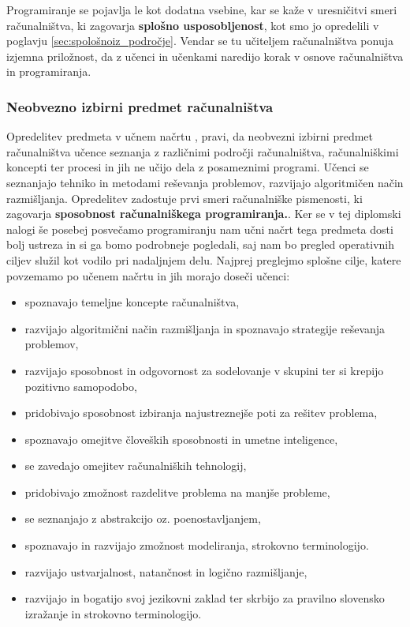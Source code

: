 Programiranje se pojavlja le kot dodatna vsebine, kar se kaže v
uresničitvi smeri računalništva, ki zagovarja \textbf{splošno
  usposobljenost}, kot smo jo opredelili v poglavju
\ref{sec:spološnoiz_področje}. Vendar se tu učiteljem računalništva
ponuja izjemna priložnost, da z učenci in učenkami naredijo korak v
osnove računalništva in programiranja.

\subsubsection{Neobvezno izbirni predmet računalništva}
\label{sec:neobvezno_izbirni_predmet_rac}

Opredelitev predmeta v učnem načrtu
\cite{ucni_nacrt-neobvezni-izbirni-os}, pravi, da neobvezni izbirni
predmet računalništva učence seznanja z različnimi področji
računalništva, računalniškimi koncepti ter procesi in jih ne učijo
dela z posameznimi programi. Učenci se seznanjajo tehniko in metodami
reševanja problemov, razvijajo algoritmičen način
razmišljanja. Opredelitev zadostuje prvi smeri računalniške
pismenosti, ki zagovarja \textbf{sposobnost računalniškega
  programiranja.}. Ker se v tej diplomski nalogi še posebej posvečamo
programiranju nam učni načrt tega predmeta dosti bolj ustreza in si ga
bomo podrobneje pogledali, saj nam bo pregled operativnih ciljev
služil kot vodilo pri nadaljnjem delu.  Najprej preglejmo splošne
cilje, katere povzemamo po učenem načrtu
\cite{ucni_nacrt-neobvezni-izbirni-os} in jih morajo doseči učenci:
\begin{itemize}
\tightlist
\item spoznavajo temeljne koncepte računalništva,
\item razvijajo algoritmični način razmišljanja in spoznavajo
  strategije reševanja problemov,
\item razvijajo sposobnost in odgovornost za sodelovanje v skupini ter
  si krepijo pozitivno samopodobo,
\item pridobivajo sposobnost izbiranja najustreznejše poti za rešitev
  problema,
\item  spoznavajo omejitve človeških sposobnosti in umetne
  inteligence,
\item se zavedajo omejitev računalniških tehnologij,
\item pridobivajo zmožnost razdelitve problema na manjše probleme,
\item se seznanjajo z abstrakcijo oz. poenostavljanjem,
\item spoznavajo in razvijajo zmožnost modeliranja, strokovno
  terminologijo.
\item  razvijajo ustvarjalnost, natančnost in logično razmišljanje,
\item razvijajo in bogatijo svoj jezikovni zaklad ter skrbijo za
  pravilno slovensko izražanje in strokovno terminologijo.
\end{itemize}

